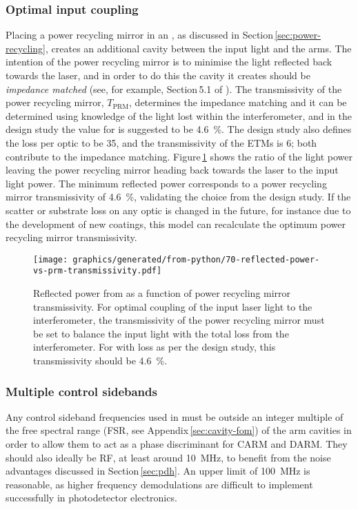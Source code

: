 \subsubsection{Optimal input coupling}
Placing a power recycling mirror in an \MI{}, as discussed in Section\,\ref{sec:power-recycling}, creates an additional cavity between the input light and the arms. The intention of the power recycling mirror is to minimise the light reflected back towards the laser, and in order to do this the cavity it creates should be \emph{impedance matched} (see, for example, Section\,5.1 of \cite{Freise2010}). The transmissivity of the power recycling mirror, $T_{\text{PRM}}$, determines the impedance matching and it can be determined using knowledge of the light lost within the interferometer, and in the \ET{} design study the value for \ETLF{} is suggested to be \SI{4.6}{\percent}. The design study also defines the loss per optic to be \SI{35}{\ppm}, and the transmissivity of the \glspl{ETM} is \SI{6}{\ppm}; both contribute to the impedance matching. Figure\,\ref{fig:reflected-power-vs-prm-trans} shows the ratio of the light power leaving the power recycling mirror heading back towards the laser to the input light power. The minimum reflected power corresponds to a power recycling mirror transmissivity of \SI{4.6}{\percent}, validating the choice from the design study. If the scatter or substrate loss on any optic is changed in the future, for instance due to the development of new coatings, this model can recalculate the optimum power recycling mirror transmissivity.

\begin{figure}
  \centering
  \texttt{[image: graphics/generated/from-python/70-reflected-power-vs-prm-transmissivity.pdf]}
  \caption[Reflected power from \ETLF{} as a function of power recycling mirror transmissivity]{\label{fig:reflected-power-vs-prm-trans}Reflected power from \ETLF{} as a function of power recycling mirror transmissivity. For optimal coupling of the input laser light to the interferometer, the transmissivity of the power recycling mirror must be set to balance the input light with the total loss from the interferometer. For \ETLF{} with loss as per the design study, this transmissivity should be \SI{4.6}{\percent}.}
\end{figure}

\subsubsection{\label{sec:multiple-control-sidebands}Multiple control sidebands}
Any control sideband frequencies used in \ETLF{} must be outside an integer multiple of the free spectral range (\gls{FSR}, see Appendix\,\ref{sec:cavity-fom}) of the arm cavities in order to allow them to act as a phase discriminant for \gls{CARM} and \gls{DARM}. They should also ideally be \gls{RF}, at least around \SI{10}{\mega\hertz}, to benefit from the noise advantages discussed in Section\,\ref{sec:pdh}. An upper limit of \SI{100}{\mega\hertz} is reasonable, as higher frequency demodulations are difficult to implement successfully in photodetector electronics.

